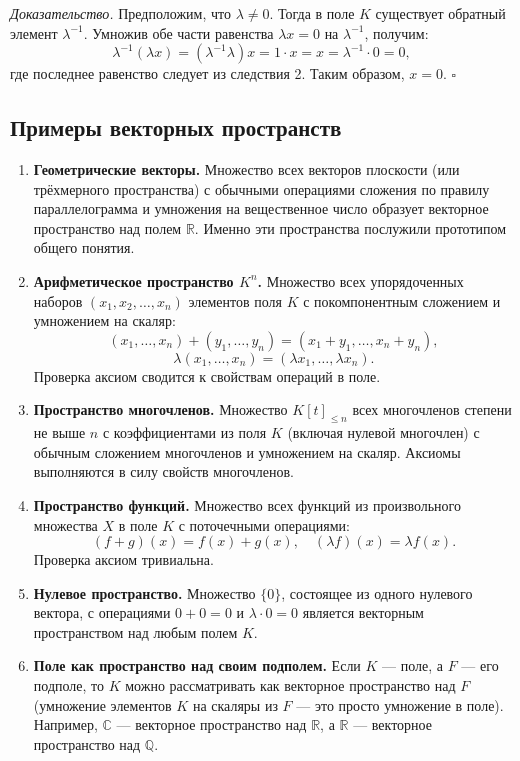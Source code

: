 \documentclass[a4paper,12pt]{article}
\theoremstyle{definition}
\theoremstyle{plain}
\theoremstyle{remark}
\begin{document}
	\medskip
	\textit{Доказательство.}
	Предположим, что \( \lambda \neq 0 \). Тогда в поле \( K \) существует обратный элемент \( \lambda^{-1} \). Умножив обе части равенства \( \lambda x = 0 \) на \( \lambda^{-1} \), получим:
	\[
	\lambda^{-1} (\lambda x) = (\lambda^{-1} \lambda) x = 1 \cdot x = x = \lambda^{-1} \cdot 0 = 0,
	\]
	где последнее равенство следует из следствия 2. Таким образом, \( x = 0 \). \hfill \(\square\)
	
	\subsection{Примеры векторных пространств}
	
	\begin{enumerate}
		\item \textbf{Геометрические векторы.} Множество всех векторов плоскости (или трёхмерного пространства) с обычными операциями сложения по правилу параллелограмма и умножения на вещественное число образует векторное пространство над полем \( \mathbb{R} \). Именно эти пространства послужили прототипом общего понятия.
		
		\item \textbf{Арифметическое пространство \( K^n \).} Множество всех упорядоченных наборов \( (x_1, x_2, \dots, x_n) \) элементов поля \( K \) с покомпонентным сложением и умножением на скаляр:
		\[
		(x_1, \dots, x_n) + (y_1, \dots, y_n) = (x_1 + y_1, \dots, x_n + y_n),
		\]
		\[
		\lambda (x_1, \dots, x_n) = (\lambda x_1, \dots, \lambda x_n).
		\]
		Проверка аксиом сводится к свойствам операций в поле.
		
		\item \textbf{Пространство многочленов.} Множество \( K[t]_{\leq n} \) всех многочленов степени не выше \( n \) с коэффициентами из поля \( K \) (включая нулевой многочлен) с обычным сложением многочленов и умножением на скаляр. Аксиомы выполняются в силу свойств многочленов.
		
		\item \textbf{Пространство функций.} Множество всех функций из произвольного множества \( X \) в поле \( K \) с поточечными операциями:
		\[
		(f + g)(x) = f(x) + g(x), \quad (\lambda f)(x) = \lambda f(x).
		\]
		Проверка аксиом тривиальна.
		
		\item \textbf{Нулевое пространство.} Множество \( \{0\} \), состоящее из одного нулевого вектора, с операциями \( 0+0 = 0 \) и \( \lambda \cdot 0 = 0 \) является векторным пространством над любым полем \( K \).
		
		\item \textbf{Поле как пространство над своим подполем.} Если \( K \) — поле, а \( F \) — его подполе, то \( K \) можно рассматривать как векторное пространство над \( F \) (умножение элементов \( K \) на скаляры из \( F \) — это просто умножение в поле). Например, \( \mathbb{C} \) — векторное пространство над \( \mathbb{R} \), а \( \mathbb{R} \) — векторное пространство над \( \mathbb{Q} \).
	\end{enumerate}
	
\end{document}
